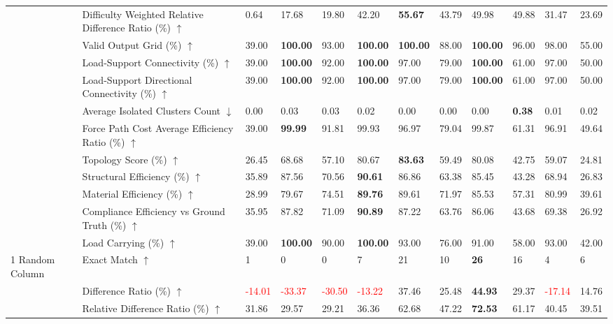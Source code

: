 \begin{table}[!h]
{\begin{tabular}{llllllllllll}
 & Difficulty Weighted Relative Difference Ratio (\%) $\uparrow$ & 0.64 & 17.68 & 19.80 & 42.20 & \textbf{55.67} & 43.79 & 49.98 & 49.88 & 31.47 & 23.69 \\
 & Valid Output Grid (\%) $\uparrow$ & 39.00 & \textbf{100.00} & 93.00 & \textbf{100.00} & \textbf{100.00} & 88.00 & \textbf{100.00} & 96.00 & 98.00 & 55.00 \\
 & Load-Support Connectivity (\%) $\uparrow$ & 39.00 & \textbf{100.00} & 92.00 & \textbf{100.00} & 97.00 & 79.00 & \textbf{100.00} & 61.00 & 97.00 & 50.00 \\
 & Load-Support Directional Connectivity (\%) $\uparrow$ & 39.00 & \textbf{100.00} & 92.00 & \textbf{100.00} & 97.00 & 79.00 & \textbf{100.00} & 61.00 & 97.00 & 50.00 \\
 & Average Isolated Clusters Count $\downarrow$ & 0.00 & 0.03 & 0.03 & 0.02 & 0.00 & 0.00 & 0.00 & \textbf{0.38} & 0.01 & 0.02 \\
 & Force Path Cost Average Efficiency Ratio (\%) $\uparrow$ & 39.00 & \textbf{99.99} & 91.81 & 99.93 & 96.97 & 79.04 & 99.87 & 61.31 & 96.91 & 49.64 \\
 & Topology Score (\%) $\uparrow$ & 26.45 & 68.68 & 57.10 & 80.67 & \textbf{83.63} & 59.49 & 80.08 & 42.75 & 59.07 & 24.81 \\
 & Structural Efficiency (\%) $\uparrow$ & 35.89 & 87.56 & 70.56 & \textbf{90.61} & 86.86 & 63.38 & 85.45 & 43.28 & 68.94 & 26.83 \\
 & Material Efficiency (\%) $\uparrow$ & 28.99 & 79.67 & 74.51 & \textbf{89.76} & 89.61 & 71.97 & 85.53 & 57.31 & 80.99 & 39.61 \\
 & Compliance Efficiency vs Ground Truth (\%) $\uparrow$ & 35.95 & 87.82 & 71.09 & \textbf{90.89} & 87.22 & 63.76 & 86.06 & 43.68 & 69.38 & 26.92 \\
 & Load Carrying (\%) $\uparrow$ & 39.00 & \textbf{100.00} & 90.00 & \textbf{100.00} & 93.00 & 76.00 & 91.00 & 58.00 & 93.00 & 42.00 \\
1 Random Column & Exact Match $\uparrow$ & 1 & 0 & 0 & 7 & 21 & 10 & \textbf{26} & 16 & 4 & 6 \\
 & Difference Ratio (\%) $\uparrow$ & \textcolor{red}{-14.01} & \textcolor{red}{-33.37} & \textcolor{red}{-30.50} & \textcolor{red}{-13.22} & 37.46 & 25.48 & \textbf{44.93} & 29.37 & \textcolor{red}{-17.14} & 14.76 \\
 & Relative Difference Ratio (\%) $\uparrow$ & 31.86 & 29.57 & 29.21 & 36.36 & 62.68 & 47.22 & \textbf{72.53} & 61.17 & 40.45 & 39.51 \\

\end{tabular}}
\end{table}
